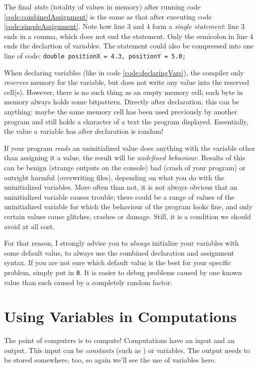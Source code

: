 The final \emph{state} (\ie totality of values in memory) after running code \ref{code:combinedAssignment} is the same as that after executing code \ref{code:simpleAssignment}. Note how line 3 and 4 form a \emph{single statement}: line 3 ends in a comma, which does not end the statement. Only the semicolon in line 4 ends the declartion of  variables. The statement could also be compressed into one line of code: \texttt{double positionX = 4.3, positionY = 5.0;}

\begin{hintbox}
When declaring variables (like in code \ref{code:declaringVars}), the compiler only \emph{reserves} memory for the variable, but does not write any value into the reserved cell(s). However, there is no such thing as an empty memory cell; each byte in memory always holds some bitpattern. Directly after declaration, this can be anything: maybe the same memory cell has been used previously by another program and still holds a character of a text the program displayed. Essentially, the value a variable has after declaration is random!

If your program \emph{reads} an uninitialized value \ie does anything with the variable other than assigning it a value, the result will be \emph{undefined behaviour}. Results of this can be benign (\eg  strange outputs on the console) bad (\eg crash of your program) or outright harmful (\eg overwriting files), depending on what you do with the uninitialized variables. More often than not, it is not always obvious that an uninitialized variable causes trouble; there could be a range of values of the uninitialized variable for which the behaviour of the program looks fine, and only certain values cause glitches, crashes or damage. Still, it is a condition we should avoid at all cost.

For that reason, I strongly advise you to \emph{always} initialize your variables with some default value, \ie to always use the combined declaration and assignment syntax. If you are not sure which default value is the best for your specific problem, simply put in \texttt{0}. It is easier to debug problems caused by one known value than such caused by a completely random factor.
\end{hintbox}


\section{Using Variables in Computations}\label{sec:OperatorsArithmetic}
The point of computers is to compute! Computations have an input and an output. This input can be \emph{constants} (such as ) or variables. The output needs to be stored somewhere, too, so again we'll see the use of variables here.

